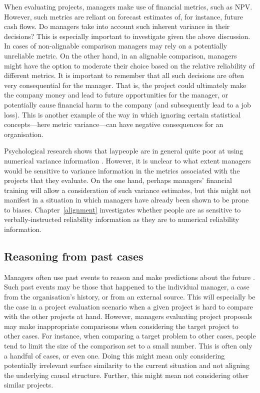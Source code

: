 \documentclass[a4paper, nobind, dvipsnames]{templates/ociamthesis}
\theoremstyle{definition}
\theoremstyle{definition}
\theoremstyle{definition}
\theoremstyle{definition}
\theoremstyle{remark}
\begin{document}
When evaluating projects, managers make use of financial metrics, such as NPV.
However, such metrics are reliant on forecast estimates of, for instance, future
cash flows. Do managers take into account such inherent variance in their
decisions? This is especially important to investigate given the above
discussion. In cases of non-alignable comparison managers may rely on a
potentially unreliable metric. On the other hand, in an alignable comparison,
managers might have the option to moderate their choice based on the relative
reliability of different metrics. It is important to remember that all such
decisions are often very consequential for the manager. That is, the project
could ultimately make the company money and lead to future opportunities for the
manager, or potentially cause financial harm to the company (and subsequently
lead to a job loss). This is another example of the way in which ignoring
certain statistical concepts---here metric variance---can have negative
consequences for an organisation.

Psychological research shows that laypeople are in general quite poor at using
numerical variance information \autocite{galesic2010,konold1993,vivalt2021,batteux2020}. However, it is unclear to what extent managers would be sensitive
to variance information in the metrics associated with the projects that they
evaluate. On the one hand, perhaps managers' financial training will allow a
consideration of such variance estimates, but this might not manifest in a
situation in which managers have already been shown to be prone to biases.
Chapter~\ref{alignment} investigates whether people are as sensitive to
verbally-instructed reliability information as they are to numerical reliability
information.

\subsection{Reasoning from past cases}

Managers often use past events to reason and make predictions about the future
\autocite{einhorn1987}. Such past events may be those that happened to the individual
manager, a case from the organisation's history, or from an external source.
This will especially be the case in a project evaluation scenario when a given
project is hard to compare with the other projects at hand. However, managers
evaluating project proposals may make inappropriate comparisons when considering
the target project to other cases. For instance, when comparing a target problem
to other cases, people tend to limit the size of the comparison set to a small
number. This is often only a handful of cases, or even one. Doing this might
mean only considering potentially irrelevant surface similarity to the current
situation and not aligning the underlying causal structure. Further, this might
mean not considering other similar projects.
\end{document}
